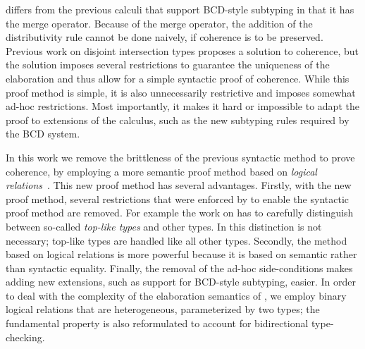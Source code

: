 \name differs from the previous calculi that support BCD-style
subtyping in that it has the merge
  operator. Because of the merge operator, the
addition of the distributivity rule cannot be done naively, if
coherence is to be preserved. Previous work on disjoint intersection types
proposes a solution to coherence, but the solution imposes several restrictions
to guarantee the uniqueness of the elaboration and thus allow for a simple
syntactic proof of coherence. While this proof method is simple, it is also
unnecessarily restrictive and imposes somewhat ad-hoc restrictions. Most
importantly, it makes it hard or impossible to adapt the proof to extensions of
the calculus, such as the new subtyping rules required by the BCD system.

In this work we remove the brittleness of the previous syntactic method to prove
coherence, by employing a more semantic proof method based on \emph{logical
  relations}~\citep{tait, plotkin1973lambda, statman1985logical}. This new proof method has several
advantages. Firstly, with the new proof method, several restrictions that were
enforced by \oname to enable the syntactic proof method are removed. For example
the work on \oname has to carefully distinguish between so-called \emph{top-like
  types} and other types. 
In \name this distinction is not necessary; top-like types are handled like all
other types. Secondly, the method based on logical relations is more powerful
because it is based on semantic rather than syntactic equality. Finally, the
removal of the ad-hoc side-conditions makes adding new extensions, such as
support for BCD-style subtyping, easier. In order to deal with the complexity of
the elaboration semantics of \name, we employ binary logical relations that are
heterogeneous, parameterized by two types; the fundamental property is also
reformulated to account for bidirectional type-checking.

\begin{comment}
\tom{We need to be careful about how to formulate the above. The proof
     method itself is not novel. What is novel is that we use it for
     this purpose.}
\jeremy{adding to tom's comment, the novelty lines in the
     design of the logical relations that are tightly related to the disjointness
     judgment, esp the relation of products. Also, compared with traditional logical
     relations, there are two differences: 1) traditional logical
     relations are usually indexed by one type, ours are heterogeneous,
     parameterized by two types; 2) fundamental property doesn't hold in our
     target language  }
\end{comment}

